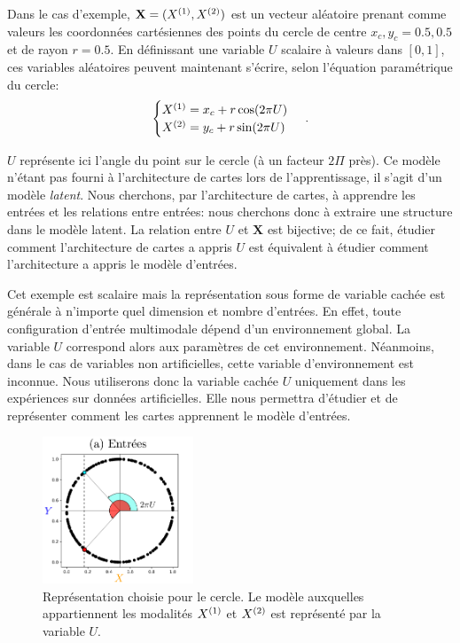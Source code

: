 \documentclass[../main]{subfiles}
\begin{document}
Dans le cas d'exemple, $\mathbf{X} = (X^{({1})},X^{({2})})$ est un vecteur aléatoire prenant comme valeurs les coordonnées cartésiennes des points du cercle de centre $x_c,y_c = 0.5,0.5$ et de rayon $r = 0.5$.
En définissant une variable $U$ scalaire à valeurs dans $[0,1]$, ces variables aléatoires peuvent maintenant s'écrire, selon l'équation paramétrique du cercle:
\begin{equation}
 \begin{cases}
     X^{({1})}= x_c + r  \cos(2\pi U)\\
     X^{({2})} = y_c + r \sin(2 \pi U)
    \end{cases}\,.
\end{equation}

$U$ représente ici l'angle du point sur le cercle (à un facteur $2\Pi$ près).
Ce modèle n'étant pas fourni à l'architecture de cartes lors de l'apprentissage, il s'agit d'un modèle \emph{latent}.
Nous cherchons, par l'architecture de cartes, à apprendre les entrées et les relations entre entrées: nous cherchons donc à extraire une structure dans le modèle latent. La relation entre $U$ et $\mathbf{X}$ est bijective; de ce fait, étudier comment l'architecture de cartes a appris $U$ est équivalent à étudier comment l'architecture a appris le modèle d'entrées.

Cet exemple est scalaire mais la représentation sous forme de variable cachée est générale à n'importe quel dimension et nombre d'entrées. En effet, toute configuration d'entrée multimodale dépend d'un environnement global. La variable $U$ correspond alors aux paramètres de cet environnement. Néanmoins, dans le cas de variables non artificielles, cette variable d'environnement est inconnue.
Nous utiliserons donc la variable cachée $U$ uniquement dans les expériences sur données artificielles. Elle nous permettra d'étudier et de représenter comment les cartes apprennent le modèle d'entrées.

\begin{figure}
\centering
\includegraphics[width=0.4\textwidth]{2som_inp.pdf}
\caption{Représentation choisie pour le cercle. Le modèle auxquelles appartiennent les modalités $X^{({1})}$ et $X^{({2})}$ est représenté par la variable $U$. \label{fig:U}}
\end{figure}
\end{document}
